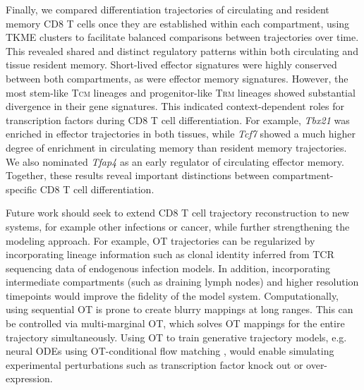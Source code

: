 Finally, we compared differentiation trajectories of circulating and resident memory CD8 T cells once they are established within each compartment, using TKME clusters to facilitate balanced comparisons between trajectories over time. This revealed shared and distinct regulatory patterns within both circulating and tissue resident memory. Short-lived effector signatures were highly conserved between both compartments, as were effector memory signatures. However, the most stem-like T\textsc{cm} lineages and progenitor-like T\textsc{rm} lineages showed substantial divergence in their gene signatures. This indicated context-dependent roles for transcription factors during CD8 T cell differentiation. For example, \textit{Tbx21} was enriched in effector trajectories in both tissues, while \textit{Tcf7} showed a much higher degree of enrichment in circulating memory than resident memory trajectories. We also nominated \textit{Tfap4} as an early regulator of circulating effector memory. Together, these results reveal important distinctions between compartment-specific CD8 T cell differentiation.

Future work should seek to extend CD8 T cell trajectory reconstruction to new systems, for example other infections or cancer, while further strengthening the modeling approach. For example, OT trajectories can be regularized by incorporating lineage information such as clonal identity inferred from TCR sequencing data of endogenous infection models. In addition, incorporating intermediate compartments (such as draining lymph nodes) and higher resolution timepoints would improve the fidelity of the model system. Computationally, using sequential OT is prone to create blurry mappings at long ranges. This can be controlled via multi-marginal OT, which solves OT mappings for the entire trajectory simultaneously. Using OT to train generative trajectory models, e.g. neural ODEs using OT-conditional flow matching \citep{tongTrajectoryNetDynamicOptimal2020, tongImprovingGeneralizingFlowbased2024, tongSimulationfreeSchrodingerBridges2024}, would enable simulating experimental perturbations such as transcription factor knock out or over-expression.
